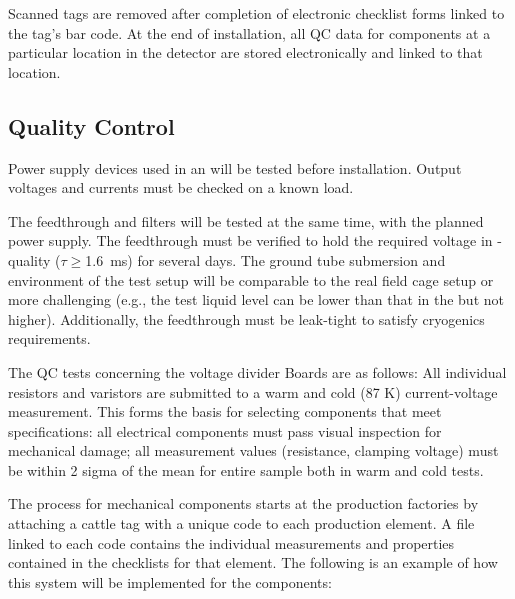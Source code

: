 Scanned tags are removed after completion of electronic checklist forms linked to the tag's bar code.  At the end of  installation, all QC data for components at a particular location in the detector are stored electronically and linked to that location.



\subsection{Quality Control}
\label{sec:fdsp-hv-transport-QC}

Power supply devices used in an  will be tested before installation.  Output voltages and currents must be checked on a known load. 

The feedthrough and filters will be tested at the same time, with the planned power supply.  The feedthrough must be verified to hold the required voltage in -quality  ($\tau\geq$\SI{1.6}{ms}) for several days.  The ground tube submersion and \efield{} environment of the test setup will be comparable to the real field cage setup or more challenging (e.g., the test liquid level can be lower than that in the  but not higher).  Additionally, the feedthrough must be leak-tight to satisfy cryogenics requirements.

The QC tests concerning the voltage divider Boards are as follows: All individual resistors and
 varistors are submitted to a warm and cold (87 K) current-voltage measurement. This forms the basis for selecting components that meet specifications: all
 electrical components must pass visual inspection for mechanical damage; all measurement values (resistance, clamping voltage) must be within 2 sigma of the mean for entire sample both in warm and cold tests.

The  process for mechanical components starts at the production factories by attaching a cattle tag with a unique code to each production element.  A file linked to each code contains the individual measurements and properties contained in the  checklists for that element.  The following is an example of how this system will be implemented for the  components:

